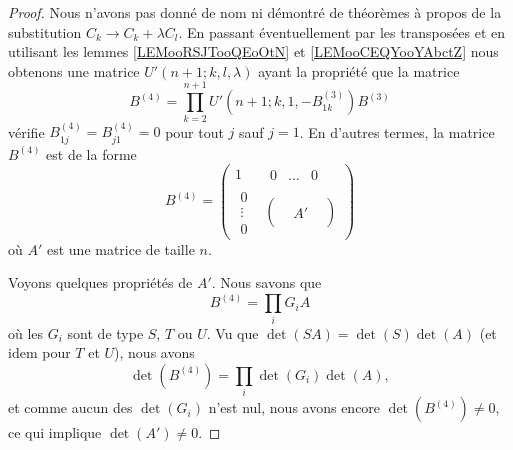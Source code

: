 \begin{proof}
	Nous n'avons pas donné de nom ni démontré de théorèmes à propos de la substitution \( C_k\to C_k+\lambda C_l\). En passant éventuellement par les transposées et en utilisant les lemmes \ref{LEMooRSJTooQEoOtN} et \ref{LEMooCEQYooYAbctZ} nous obtenons une matrice \( U'(n+1;k,l,\lambda)\) ayant la propriété que la matrice
	\begin{equation}
		B^{(4)}=\prod_{k=2}^{n+1}U'(n+1;k,1,-B^{(3)}_{1k})B^{(3)}
	\end{equation}
	vérifie \( B^{(4)}_{1j}=B^{(4)}_{j1}=0\) pour tout \( j\) sauf \( j=1\). En d'autres termes, la matrice \( B^{(4)}\) est de la forme
	\begin{equation}
		B^{(4)}=\begin{pmatrix}
			1                           & \begin{matrix}
				0 & \ldots & 0
			\end{matrix} \\
			\begin{matrix}
				0      \\
				\vdots \\
				0
			\end{matrix} & \begin{pmatrix}
				 &    & \\
				 & A' & \\
				 &    &
			\end{pmatrix}
		\end{pmatrix}
	\end{equation}
	où \( A'\) est une matrice de taille \( n\).

	Voyons quelques propriétés de \( A'\). Nous savons que
	\begin{equation}
		B^{(4)}=\prod_i G_iA
	\end{equation}
	où les \( G_i\) sont de type \( S\), \( T\) ou \( U\). Vu que \( \det(SA)=\det(S)\det(A)\) (et idem pour \( T\) et \( U\)), nous avons
	\begin{equation}
		\det(B^{(4)})=\prod_i\det(G_i)\det(A),
	\end{equation}
	et comme aucun des \( \det(G_i)\) n'est nul, nous avons encore \( \det(B^{(4)})\neq 0\), ce qui implique \( \det(A')\neq 0\).


\end{proof}

